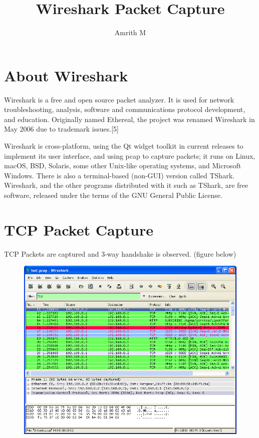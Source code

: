 \documentclass{article}
\begin{document}
\title{Wireshark Packet Capture}
\author{Amrith M}
\maketitle

\section{About Wireshark}
Wireshark is a free and open source packet analyzer. It is used for network troubleshooting, analysis, software and communications protocol development, and education. Originally named Ethereal, the project was renamed Wireshark in May 2006 due to trademark issues.[5]

Wireshark is cross-platform, using the Qt widget toolkit in current releases to implement its user interface, and using pcap to capture packets; it runs on Linux, macOS, BSD, Solaris, some other Unix-like operating systems, and Microsoft Windows. There is also a terminal-based (non-GUI) version called TShark. Wireshark, and the other programs distributed with it such as TShark, are free software, released under the terms of the GNU General Public License.

\section{TCP Packet Capture}
TCP Packets are captured and 3-way handshake is observed. (figure below)
\begin{figure}
\centering
\includegraphics[width=\textwidth,height=\textheight,keepaspectratio]{TCP.png}
\end{figure}
\end{document}
